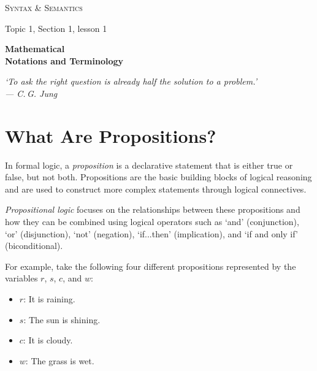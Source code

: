 \documentclass[a4paper, twoside]{article}
\newcommand{\standardpage}{
    \pagestyle{standard}
}
\begin{document}
\begin{titlepage}
\thispagestyle{copyright}
\centering

\vspace*{3cm}

{\Huge\scshape Syntax \& Semantics\par}
\vspace{0.3cm}

{\large Topic 1, Section 1, lesson 1\par}

\vspace{1.2cm}

{\LARGE\bfseries Mathematical \\[0.3em]
\large Notations and Terminology\par}
\vfill

\begin{minipage}{0.7\textwidth}
\centering
\small\itshape
`To ask the right question is already half the solution to a problem.'\\[0.3cm]
— C.\,G. Jung
\end{minipage}

\vspace{1.5cm}

\end{titlepage}

\newpage
\standardpage

\restoregeometry 
{}
\setcounter{page}{1}

\section{What Are Propositions?}
In formal logic, a \textit{proposition} is a declarative statement that is either true or false, but not both. Propositions are the basic building blocks of logical reasoning and are used to construct more complex statements through logical connectives.

\textit{Propositional logic} focuses on the relationships between these propositions and how they can be combined using logical operators such as `and' (conjunction), `or' (disjunction), `not' (negation), `if...then' (implication), and `if and only if' (biconditional).



For example, take the following four different propositions represented by the variables \(r\), \(s\), \(c\), and \(w\):

\begin{itemize}
    \item \(r\): It is raining.
    \item \(s\): The sun is shining.
    \item \(c\): It is cloudy.
    \item \(w\): The grass is wet.
\end{itemize}
\end{document}
